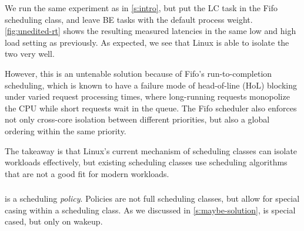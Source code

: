We run the same experiment as in \autoref{s:intro}, but put the LC task in the
Fifo scheduling class, and leave BE tasks with the default process weight.
\autoref{fig:unedited-rt} shows the resulting measured latencies in the same low
and high load setting as previously. As expected, we see that Linux is able to
isolate the two very well. 

However, this is an untenable solution because of Fifo's run-to-completion
scheduling, which is known to have a failure mode of head-of-line (HoL) blocking
under varied request processing times, where long-running requests monopolize
the CPU while short requests wait in the queue. The Fifo scheduler also enforces
not only cross-core isolation between different priorities, but also a global
ordering within the same priority.

The takeaway is that Linux's current mechanism of scheduling classes can isolate
workloads effectively, but existing scheduling classes use scheduling
algorithms that are not a good fit for modern workloads.

\subsubsection{\schedidle}\label{ss:schedidle}

\schedidle{} is a scheduling \textit{policy}. Policies are not full scheduling
classes, but allow for special casing within a scheduling class. As we discussed
in \autoref{s:maybe-solution}, \schedidle{} is special cased, but only on
wakeup.

